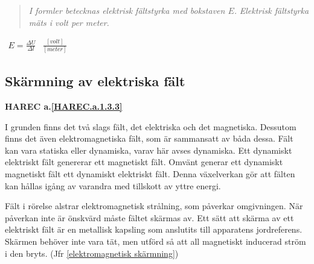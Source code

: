 \begin{quote}
\emph{I formler betecknas elektrisk fältstyrka med bokstaven \(E\).}
\emph{Elektrisk fältstyrka mäts i volt per meter.}
\end{quote}

\(
\begin{array}{cc}
E=\frac{\Delta U}{\Delta l} & \frac{[volt]}{[meter]}
\end{array}
\)

\subsection{Skärmning av elektriska fält}
\textbf{HAREC a.\ref{HAREC.a.1.3.3}\label{myHAREC.a.1.3.3}}
\label{elektrostatik skärmning}

I grunden finns det två slags fält, det elektriska och det magnetiska. Dessutom
finns det även elektromagnetiska fält, som är sammansatt av båda dessa. Fält
kan vara statiska eller dynamiska, varav här avses dynamiska. Ett dynamiskt
elektriskt fält genererar ett magnetiskt fält. Omvänt generar ett dynamiskt
magnetiskt fält ett dynamiskt elektriskt fält. Denna växelverkan gör att fälten
kan hållas igång av varandra med tillskott av yttre energi.

Fält i rörelse alstrar elektromagnetisk strålning, som påverkar omgivningen. När
påverkan inte är önskvärd måste fältet skärmas av. Ett sätt att skärma av ett
elektriskt fält är en metallisk kapsling som anslutits till apparatens
jordreferens. Skärmen behöver inte vara tät, men utförd så att all magnetiskt
inducerad ström i den bryts. (Jfr \ref{elektromagnetisk skärmning})
